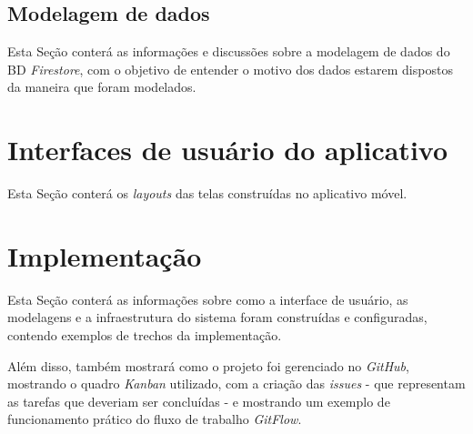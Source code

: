 \subsection{Modelagem de dados}

Esta Seção conterá as informações e discussões sobre a modelagem de dados do BD \textit{Firestore}, com o objetivo de entender o motivo dos dados estarem dispostos da maneira que foram modelados.

\section{Interfaces de usuário do aplicativo}\label{sec:uiux}
Esta Seção conterá os \textit{layouts} das telas construídas no aplicativo móvel.

\section{Implementação}\label{sec:implementacao}
Esta Seção conterá as informações sobre como a interface de usuário, as modelagens e a infraestrutura do sistema foram construídas e configuradas, contendo exemplos de trechos da implementação.

Além disso, também mostrará como o projeto foi gerenciado no \textit{GitHub}, mostrando o quadro \textit{Kanban} utilizado, com a criação das \textit{issues} - que representam as tarefas que deveriam ser concluídas - e mostrando um exemplo de funcionamento prático do fluxo de trabalho \textit{GitFlow}.